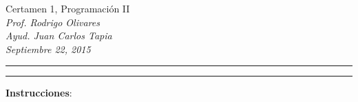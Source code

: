 \documentclass[10pt]{article}
\begin{document}
\begin{center}
    {\Large Certamen 1, Programaci\'on II} \\
    \emph{\small Prof. Rodrigo Olivares} \\
    \emph{\small Ayud. Juan Carlos Tapia} \\
    \emph{\scriptsize Septiembre 22, 2015}
\end{center}
\vspace*{-35pt}
\begin{center}
    \rule{1\textwidth}{.3pt}
\end{center}
\vspace*{-42pt}
\begin{center}
    \rule{1\textwidth}{2pt}
\end{center}

\vspace*{-15pt}
{\small \textbf{Instrucciones}:}
\vspace*{-15pt}
\end{document}
